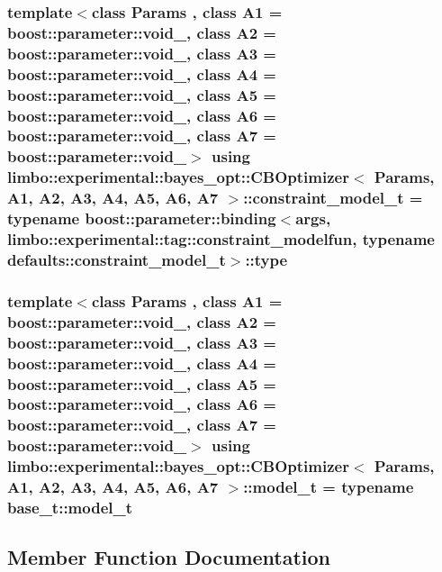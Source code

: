 \subsubsection[{constraint\+\_\+model\+\_\+t}]{\setlength{\rightskip}{0pt plus 5cm}template$<$class Params , class A1  = boost\+::parameter\+::void\+\_\+, class A2  = boost\+::parameter\+::void\+\_\+, class A3  = boost\+::parameter\+::void\+\_\+, class A4  = boost\+::parameter\+::void\+\_\+, class A5  = boost\+::parameter\+::void\+\_\+, class A6  = boost\+::parameter\+::void\+\_\+, class A7  = boost\+::parameter\+::void\+\_\+$>$ using {\bf limbo\+::experimental\+::bayes\+\_\+opt\+::\+C\+B\+Optimizer}$<$ Params, A1, A2, A3, A4, A5, A6, A7 $>$\+::{\bf constraint\+\_\+model\+\_\+t} =  typename boost\+::parameter\+::binding$<${\bf args}, limbo\+::experimental\+::tag\+::constraint\+\_\+modelfun, typename {\bf defaults\+::constraint\+\_\+model\+\_\+t}$>$\+::type}\label{classlimbo_1_1experimental_1_1bayes__opt_1_1_c_b_optimizer_a5cb12c91d5ba4ea49768779178c6a2c6}
\hypertarget{classlimbo_1_1experimental_1_1bayes__opt_1_1_c_b_optimizer_ac4e7081d6af43c4e0d251998795717ca}{}
\subsubsection[{model\+\_\+t}]{\setlength{\rightskip}{0pt plus 5cm}template$<$class Params , class A1  = boost\+::parameter\+::void\+\_\+, class A2  = boost\+::parameter\+::void\+\_\+, class A3  = boost\+::parameter\+::void\+\_\+, class A4  = boost\+::parameter\+::void\+\_\+, class A5  = boost\+::parameter\+::void\+\_\+, class A6  = boost\+::parameter\+::void\+\_\+, class A7  = boost\+::parameter\+::void\+\_\+$>$ using {\bf limbo\+::experimental\+::bayes\+\_\+opt\+::\+C\+B\+Optimizer}$<$ Params, A1, A2, A3, A4, A5, A6, A7 $>$\+::{\bf model\+\_\+t} =  typename {\bf base\+\_\+t\+::model\+\_\+t}}\label{classlimbo_1_1experimental_1_1bayes__opt_1_1_c_b_optimizer_ac4e7081d6af43c4e0d251998795717ca}


\subsection{Member Function Documentation}
\hypertarget{classlimbo_1_1experimental_1_1bayes__opt_1_1_c_b_optimizer_af7b2e8e92cf103d2e44ed1fa75eb8c8b}{}
